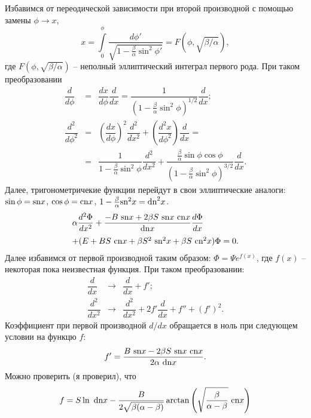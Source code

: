 \documentclass[12pt]{article}
\begin{document}
Избавимся от переодической зависимости при второй производной с помощью замены $\phi \to x$,
%
\begin{equation*}
x = \int \limits_0^\phi \dfrac{d \phi'}{\sqrt{1 - \frac{\beta}{\alpha} \sin^2 \phi'}} = F(\phi, \sqrt{\beta / \alpha}),
\end{equation*}
%
где $F(\phi, \sqrt{\beta / \alpha})$ -- неполный эллиптический интеграл первого рода.
При таком преобразовании
%
\begin{eqnarray*}
\dfrac{d}{d \phi} & = & \dfrac{dx}{d \phi} \dfrac{d}{dx} =  \dfrac{1}{(1 - \frac{\beta}{\alpha} \sin^2 \phi)^{1/2}} \dfrac{d}{dx};\\
\dfrac{d^2}{d \phi^2} & = & \left( \dfrac{dx}{d\phi} \right)^2 \dfrac{d^2}{dx^2} + \left( \dfrac{d^2 x}{d \phi^2} \right) \dfrac{d}{dx} = \\
& = & \dfrac{1}{1 - \frac{\beta}{\alpha} \sin^2 \phi} \dfrac{d^2}{dx^2} + \dfrac{\frac{\beta}{\alpha} \sin \phi \cos \phi}{(1 - \frac{\beta}{\alpha} \sin^2 \phi)^{3/2}} \dfrac{d}{dx}.
\end{eqnarray*}
%
Далее, тригонометричекие функции перейдут в свои эллиптические аналоги: $\sin \phi = \textrm{sn} x$, $\cos \phi = \textrm{cn} x$, $1 - \frac{\beta}{\alpha} \textrm{sn}^2 x = \textrm{dn}^2 x$.
%
\begin{equation}
\begin{array}{l}
	\alpha \dfrac{d^2 \Phi}{d x^2} + \dfrac{-B~\textrm{sn} x + 2 \beta S~\textrm{sn} x~\textrm{cn} x}{\textrm{dn} x} \dfrac{d \Phi}{dx} \\[10pt]
	+ (E + BS~\textrm{cn} x + \beta S^2~\textrm{sn}^2 x + \beta S~\textrm{cn}^2 x) \Phi = 0.
\end{array}
\end{equation}
%
Далее избавимся от первой производной таким образом: $\Phi = \Psi e^{f(x)}$, где $f(x)$ -- некоторая пока неизвестная функция.
При таком преобразовании:
%
\begin{equation*}
\begin{array}{lcl}
	\dfrac{d}{dx} & \to & \dfrac{d}{dx} + f';\\[10pt]
	\dfrac{d^2}{dx^2} & \to & \dfrac{d^2}{dx^2} + 2f' \dfrac{d}{dx} + f'' + (f')^2.
\end{array}
\end{equation*}
%
Коэффициент при первой производной $d/dx$ обращается в ноль при следующем условии на функцю $f$:
%
\begin{equation}
f' = \dfrac{B~\textrm{sn} x - 2 \beta S~\textrm{sn} x~\textrm{cn} x}{2 \alpha~\textrm{dn} x}.
\label{eq:f_condition}
\end{equation}
%
Можно проверить (я проверил), что
%
\begin{equation}
f = S \ln~\textrm{dn} x - \frac{B}{2 \sqrt{\beta(\alpha - \beta)}} \arctan \left( \sqrt{\frac{\beta}{\alpha - \beta}}~\textrm{cn} x \right)
\end{equation}
\end{document}
